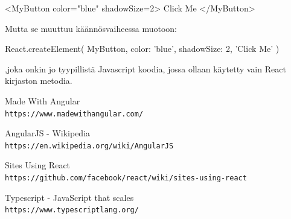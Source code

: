 \documentclass[a4paper,12pt,twoside]{article} %
\begin{document}
\vspace{4mm}\noindent
<MyButton color="blue" shadowSize={2}>
  Click Me
</MyButton>

\vspace{4mm}\noindent
Mutta se muuttuu käännösvaiheessa muotoon:

\vspace{4mm}\noindent
React.createElement(
  MyButton,
  {color: 'blue', shadowSize: 2},
  'Click Me'
)

\vspace{4mm}\noindent
,joka onkin jo tyypillistä Javascript koodia, jossa ollaan käytetty vain React kirjaston metodia. 

\newpage
\setcounter{secnumdepth}{0}

\begin{thebibliography}{9}

Made With Angular
\\\texttt{https://www.madewithangular.com/}

AngularJS - Wikipedia
\\\texttt{https://en.wikipedia.org/wiki/AngularJS}

Sites Using React
\\\texttt{https://github.com/facebook/react/wiki/sites-using-react}

Typescript - JavaScript that scales
\\\texttt{https://www.typescriptlang.org/}

\end{thebibliography}
\end{document}
